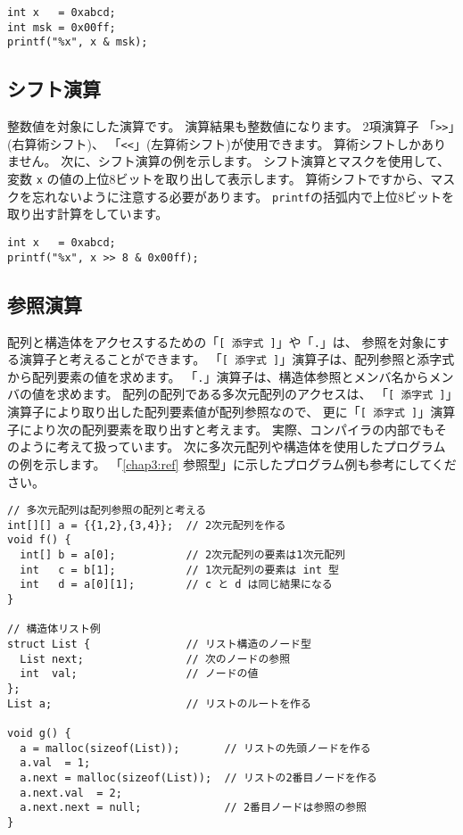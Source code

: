 \begin{mylist}
\begin{verbatim}
int x   = 0xabcd;
int msk = 0x00ff;
printf("%x", x & msk);
\end{verbatim}
\end{mylist}

\subsection{シフト演算}

整数値を対象にした演算です。
演算結果も整数値になります。
2項演算子
「\verb/>>/」(右算術シフト)、
「\verb/<</」(左算術シフト)が使用できます。
算術シフトしかありません。
次に、シフト演算の例を示します。
シフト演算とマスクを使用して、
変数 \verb/x/ の値の上位8ビットを取り出して表示します。
算術シフトですから、マスクを忘れないように注意する必要があります。
\verb/printf/の括弧内で上位8ビットを取り出す計算をしています。

\begin{mylist}
\begin{verbatim}
int x   = 0xabcd;
printf("%x", x >> 8 & 0x00ff);
\end{verbatim}
\end{mylist}

\subsection{参照演算}

配列と構造体をアクセスするための「\verb/[ 添字式 ]/」や「\verb/./」は、
参照を対象にする演算子と考えることができます。
「\verb/[ 添字式 ]/」演算子は、配列参照と添字式から配列要素の値を求めます。
「\verb/./」演算子は、構造体参照とメンバ名からメンバの値を求めます。
配列の配列である多次元配列のアクセスは、
「\verb/[ 添字式 ]/」演算子により取り出した配列要素値が配列参照なので、
更に「\verb/[ 添字式 ]/」演算子により次の配列要素を取り出すと考えます。
実際、\cmm コンパイラの内部でもそのように考えて扱っています。
次に多次元配列や構造体を使用したプログラムの例を示します。
「\ref{chap3:ref} 参照型」に示したプログラム例も参考にしてください。

\begin{mylist}
\begin{verbatim}
// 多次元配列は配列参照の配列と考える
int[][] a = {{1,2},{3,4}};  // 2次元配列を作る
void f() {
  int[] b = a[0];           // 2次元配列の要素は1次元配列
  int   c = b[1];           // 1次元配列の要素は int 型
  int   d = a[0][1];        // c と d は同じ結果になる
}

// 構造体リスト例
struct List {               // リスト構造のノード型
  List next;                // 次のノードの参照
  int  val;                 // ノードの値
};
List a;                     // リストのルートを作る

void g() {
  a = malloc(sizeof(List));       // リストの先頭ノードを作る
  a.val  = 1;
  a.next = malloc(sizeof(List));  // リストの2番目ノードを作る
  a.next.val  = 2;
  a.next.next = null;             // 2番目ノードは参照の参照
}
\end{verbatim}
\end{mylist}

